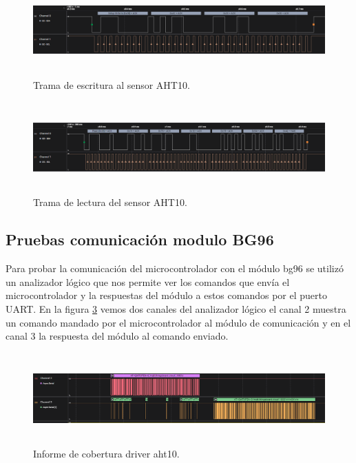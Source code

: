 \begin{figure}[h!]
  \centering
    \includegraphics[width=\linewidth, height=3.5cm]{./Figures/write_i2c.png}
  \caption{Trama de escritura al sensor AHT10.}
    \label{fig:write aht10}
\end{figure}

\begin{figure}[h!]
  \centering
    \includegraphics[width=\linewidth, height=3.5cm]{./Figures/read_i2c..png}
  \caption{Trama de lectura del sensor AHT10.}
    \label{fig:read aht10}
\end{figure}

\subsection{Pruebas comunicación modulo BG96}

Para probar la comunicación del microcontrolador con el módulo bg96 se utilizó un analizador lógico que nos permite ver los comandos que envía el microcontrolador y la respuestas del módulo a estos comandos por el puerto UART.
En la figura \ref{fig:trama uart1} vemos dos canales del analizador  lógico el canal 2 muestra un comando mandado por el microcontrolador al módulo de comunicación y en el canal 3 la respuesta del módulo al comando enviado.

\begin{figure}[h!]
  \centering
    \includegraphics[width=\linewidth, height=3.5cm]{./Figures/trama_uart1.png}
  \caption{Informe de cobertura driver aht10.}
    \label{fig:trama uart1}
\end{figure}

